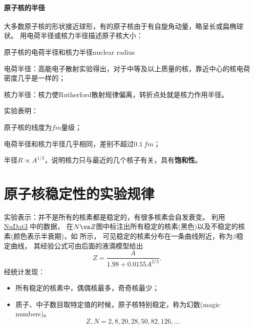 \paragraph{原子核的半径}

大多数原子核的形状接近球形，有的原子核由于有自旋角动量，略呈长或扁椭球状。
用电荷半径或核力半径描述原子核大小：
\begin{definition}
	{原子核的电荷半径和核力半径}{nuclear radius}
	\begin{compactitem}
		\item 电荷半径：高能电子散射实验得出，对于中等及以上质量的核，靠近中心的核电荷密度几乎是一样的；
		\item 核力半径：核力使Rutherford散射规律偏离，转折点处就是核力作用半径。
	\end{compactitem}
\end{definition}
实验表明：
\begin{compactenum}
	\item 原子核的线度为$\si{fm}$量级；
	\item 电荷半径和核力半径几乎相同，差别不超过$\SI{0.1}{fm}$；
	\item 半径$R\propto A^{1/3}$，说明核力只与最近的几个核子有关，具有\textbf{饱和性}。
\end{compactenum}

\section{原子核稳定性的实验规律}

实验表示：并不是所有的核素都是稳定的，有很多核素会自发衰变。
利用 \href{https://www.nndc.bnl.gov/nudat3/}{NuDat3} 中的数据，
在$N\vs Z$图中标注出所有稳定的核素(黑色)以及不稳定的核素(颜色表示半衰期)，如 所示，
可见稳定的核素分布在一条曲线附近，称为$\beta$稳定曲线，
其经验公式可由后面的液滴模型给出
\begin{equation}
	Z=\frac A{1.98 + 0.0155A^{2/3}}.
\end{equation}
经统计发现：
\begin{itemize}
	\item 所有稳定的核素中，偶偶核最多，奇奇核最少；
	\item 质子、中子数目取特定值的时候，原子核特别稳定，称为幻数(magic numbers)。
	\begin{equation}
		Z,N=2,8,20,28,50,82,126,\ldots
	\end{equation}
\end{itemize}

